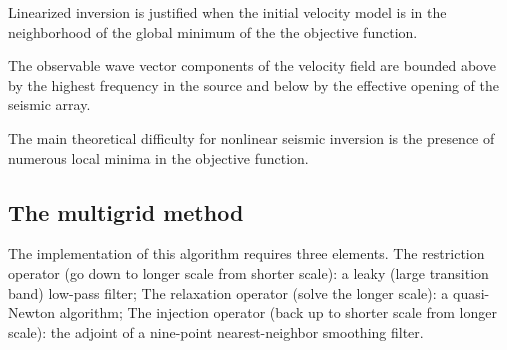 Linearized inversion is justified when the initial velocity model is
in the neighborhood of the global minimum of the the objective function.

The observable wave vector components of the velocity field are bounded
above by the highest frequency in the source and
below by the effective opening of the seismic array.

The main theoretical difficulty for nonlinear seismic inversion is
the presence of numerous local minima in the objective function.

\subsection{The multigrid method}
The implementation of this algorithm requires three elements.
The restriction operator (go down to longer scale from shorter scale):
a leaky (large transition band) low-pass filter;
The relaxation operator (solve the longer scale): a quasi-Newton algorithm;
The injection operator (back up to shorter scale from longer scale):
the adjoint of a nine-point nearest-neighbor smoothing filter.

